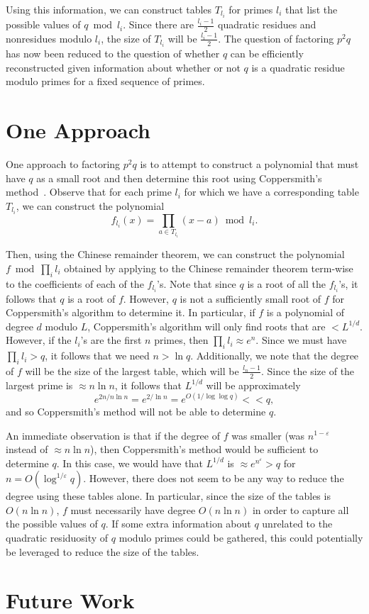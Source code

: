 \documentclass[letterpaper,twocolumn,10pt]{article}
\begin{document}
Using this information, we can construct tables $T_{l_i}$ for primes $l_i$ that list the possible values of $q \bmod l_i$. Since there are $\frac{l_i - 1}{2}$ quadratic residues and nonresidues modulo $l_i$, the size of $T_{l_i}$ will be $\frac{l_i - 1}{2}$. The question of factoring $p^2 q$ has now been reduced to the question of whether $q$ can be efficiently reconstructed given information about whether or not $q$ is a quadratic residue modulo primes for a fixed sequence of primes. 

\section{One Approach}

One approach to factoring $p^2 q$ is to attempt to construct a polynomial that must have $q$ as a small root and then determine this root using Coppersmith's method~\cite{Coppersmith}. Observe that for each prime $l_i$ for which we have a corresponding table $T_{l_i}$, we can construct the polynomial
\[
f_{l_i}(x) = \prod_{a \in T_{l_i}} (x - a) \bmod l_i.
\]

Then, using the Chinese remainder theorem, we can construct the polynomial $f \bmod \prod_i l_i$ obtained by applying to the Chinese remainder theorem term-wise to the coefficients of each of the $f_{l_i}$'s. Note that since $q$ is a root of all the $f_{l_i}$'s, it follows that $q$ is a root of $f$. However, $q$ is not a sufficiently small root of $f$ for Coppersmith's algorithm to determine it. In particular, if $f$ is a polynomial of degree $d$ modulo $L$, Coppersmith's algorithm will only find roots that are $< L^{1/d}$. However, if the $l_i$'s are the first $n$ primes, then $\prod_i l_i \approx e^n$. Since we must have $\prod_i l_i > q$, it follows that we need $n > \ln q$. Additionally, we note that the degree of $f$ will be the size of the largest table, which will be $\frac{l_n - 1}{2}$. Since the size of the largest prime is $\approx n \ln n$, it follows that $L^{1/d}$ will be approximately
\[
e^{2n/n\ln n} = e^{2/\ln n} = e^{O(1/\log \log q)}  << q,
\]  
and so Coppersmith's method will not be able to determine $q$.

An immediate observation is that if the degree of $f$ was smaller (was $n^{1 - \varepsilon}$ instead of $\approx n \ln n$), then Coppersmith's method would be sufficient to determine $q$. In this case, we would have that $L^{1/d}$ is $\approx e^{n^{\varepsilon}} > q$ for $n = O(\log^{1/\varepsilon} q)$. However, there does not seem to be any way to reduce the degree using these tables alone. In particular, since the size of the tables is $O(n \ln n)$, $f$ must necessarily have degree $O(n \ln n)$ in order to capture all the possible values of $q$. If some extra information about $q$ unrelated to the quadratic residuosity of $q$ modulo primes could be gathered, this could potentially be leveraged to reduce the size of the tables. 

\section{Future Work}





{\footnotesize 
}


\end{document}
